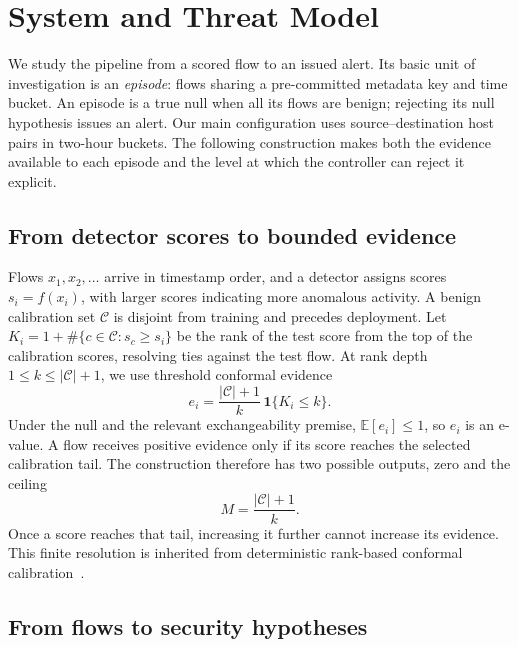 \documentclass[conference]{IEEEtran}
\newcommand{\Cal}{\mathcal{C}}
\newcommand{\nCal}{\lvert\Cal\rvert}
\newcommand{\ceil}{M}
\begin{document}
\section{System and Threat Model}\label{sec:model}

We study the pipeline from a scored flow to an issued alert. Its basic unit of investigation is an
\emph{episode}: flows sharing a pre-committed metadata key and time bucket. An episode is a true null
when all its flows are benign; rejecting its null hypothesis issues an alert. Our main configuration
uses source--destination host pairs in two-hour buckets. The following construction makes both
the evidence available to each episode and the level at which the controller can reject it explicit.

\subsection{From detector scores to bounded evidence}\label{sec:controllers}

Flows $x_1,x_2,\ldots$ arrive in timestamp order, and a detector assigns scores $s_i=f(x_i)$, with
larger scores indicating more anomalous activity. A benign calibration set $\Cal$ is disjoint from
training and precedes deployment. Let $K_i=1+\#\{c\in\Cal:s_c\ge s_i\}$ be the rank of the test score
from the top of the calibration scores, resolving ties against the test flow. At rank depth
$1\le k\le\nCal+1$, we use threshold conformal evidence
\begin{equation}\label{eq:evalue}
e_i=\frac{\nCal+1}{k}\,\mathbf 1\{K_i\le k\}.
\end{equation}
Under the null and the relevant exchangeability premise, $\mathbb E[e_i]\le1$, so $e_i$ is an
e-value. A flow receives positive evidence only if its score reaches the selected calibration tail.
The construction therefore has two possible outputs, zero and the ceiling
\begin{equation}\label{eq:ceiling}
\ceil=\frac{\nCal+1}{k}.
\end{equation}
Once a score reaches that tail, increasing it further cannot increase its evidence. This finite
resolution is inherited from deterministic rank-based conformal
calibration~\cite{vovk2005alrw,hennhofer2026resolution}.

\subsection{From flows to security hypotheses}\label{sec:grouping}
\end{document}
